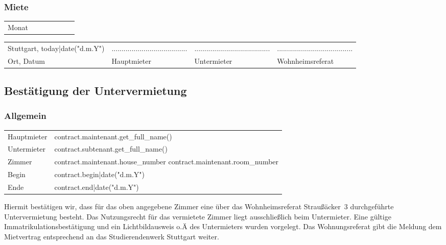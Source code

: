 \documentclass[9pt,pdftex,a4paper]{article}
\newcommand{\signLine}{......................................}
\begin{document}
\subsubsection*{Miete}
{%
\begin{tabularx}{\textwidth}{lXXXXXX}
Monat {%
Miete {%
\end{tabularx}
{%

\vfill

\begin{tabularx}{\textwidth}{@{}YYYY@{}}
Stuttgart, {{ today|date("d.m.Y") }} & \signLine & \signLine & \signLine\\
Ort, Datum &  Hauptmieter& Untermieter & Wohnheimsreferat\\
\end{tabularx}

%
%

\newpage

\subsection*{Bestätigung der Untervermietung}

\subsubsection*{Allgemein}
\begin{tabularx}{\textwidth}{XX}
Hauptmieter & {{ contract.maintenant.get_full_name() }}\\
Untermieter &  {{ contract.subtenant.get_full_name() }}\\
Zimmer & {{ contract.maintenant.house_number }} {{ contract.maintenant.room_number }}\\
Begin & {{ contract.begin|date("d.m.Y") }}\\
Ende & {{ contract.end|date("d.m.Y") }}\\
\end{tabularx}\bigskip

Hiermit bestätigen wir, dass für das oben angegebene Zimmer eine über das Wohnheimsreferat Straußäcker~3 durchgeführte Untervermietung besteht.
Das Nutzungsrecht für das vermietete Zimmer liegt ausschließlich beim Untermieter.
Eine gültige Immatrikulationsbestätigung und ein Lichtbildausweis o.Ä des Untermieters wurden vorgelegt.
Das Wohnungsreferat gibt die Meldung dem Mietvertrag entsprechend an das Studierendenwerk Stuttgart weiter.\bigskip


}}
\end{document}
